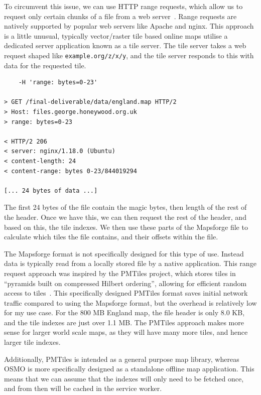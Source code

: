 \documentclass[hyphens]{final_report}
\begin{document}
To circumvent this issue, we can use HTTP range requests, which allow us to request only certain chunks of a file from a web server~\cite{mdn-range-requests}. Range requests are natively supported by popular web servers like Apache and nginx. This approach is a little unusual, typically vector/raster tile based online maps utilise a dedicated server application known as a tile server. The tile server takes a web request shaped like \texttt{example.org/z/x/y}, and the tile server responds to this with data for the requested tile.

\begin{lstlisting}[caption=Using \texttt{curl} to make a HTTP range request, label=lst:range-request, numbers=none]
% curl -v 'https://files.george.honeywood.org.uk/final-deliverable/data/england.map' \
    -H 'range: bytes=0-23'

> GET /final-deliverable/data/england.map HTTP/2
> Host: files.george.honeywood.org.uk
> range: bytes=0-23

< HTTP/2 206 
< server: nginx/1.18.0 (Ubuntu)
< content-length: 24
< content-range: bytes 0-23/844019294

[... 24 bytes of data ...]
\end{lstlisting}

The first 24 bytes of the file contain the magic bytes, then length of the rest of the header. Once we have this, we can then request the rest of the header, and based on this, the tile indexes. We then use these parts of the Mapsforge file to calculate which tiles the file contains, and their offsets within the file.

The Mapsforge format is not specifically designed for this type of use. Instead data is typically read from a locally stored file by a native application. This range request approach was inspired by the PMTiles project, which stores tiles in ``pyramids built on compressed Hilbert ordering'', allowing for efficient random access to tiles~\cite{pmtiles}. This specifically designed PMTiles format saves initial network traffic compared to using the Mapsforge format, but the overhead is relatively low for my use case. For the 800 MB England map, the file header is only 8.0 KB, and the tile indexes are just over 1.1 MB\@. The PMTiles approach makes more sense for larger world scale maps, as they will have many more tiles, and hence larger tile indexes. 

Additionally, PMTiles is intended as a general purpose map library, whereas OSMO is more specifically designed as a standalone offline map application. This means that we can assume that the indexes will only need to be fetched once, and from then will be cached in the service worker.
\end{document}
